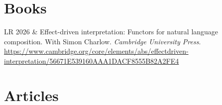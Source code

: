 \documentclass[12pt]{article}
\renewcommand{\arraystretch}{1.25} %
\newcommand{\refmark}{\textcolor{gray}{}}
\newcommand{\flag}{}
\begin{document}
\medskip

\section*{Books}

\begingroup
\renewcommand{\arraystretch}{1.5} %
\begin{longtable}{LR}
  \flag%
  2026
        & Effect-driven interpretation: Functors for natural language composition.\newline
          With Simon Charlow.\newline
          \textit{Cambridge University Press}.\newline
          \url{https://www.cambridge.org/core/elements/abs/effectdriven-interpretation/56671E539160AAA1DACF8555B82A2FE4}
\end{longtable}
\endgroup

\medskip

\section*{Articles%
}
\end{document}
